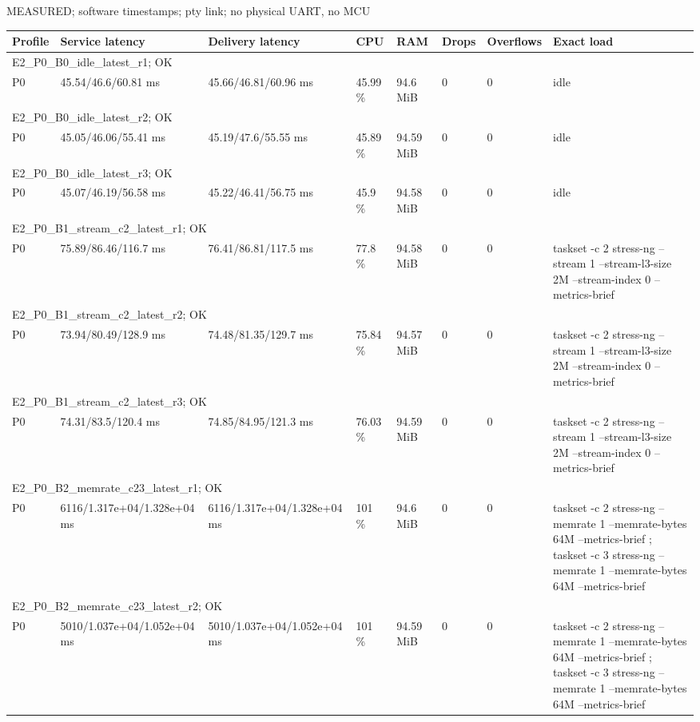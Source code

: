 \par\noindent MEASURED; software timestamps; pty link; no physical UART, no MCU\par
\begin{tabular}{llllllll}
\toprule
Profile & Service latency & Delivery latency & CPU & RAM & Drops & Overflows & Exact load \\
\midrule
\multicolumn{8}{l}{E2\_P0\_B0\_idle\_latest\_r1; OK} \\
P0 & 45.54/46.6/60.81 ms & 45.66/46.81/60.96 ms & 45.99 \% & 94.6 MiB & 0 & 0 & idle \\
\multicolumn{8}{l}{E2\_P0\_B0\_idle\_latest\_r2; OK} \\
P0 & 45.05/46.06/55.41 ms & 45.19/47.6/55.55 ms & 45.89 \% & 94.59 MiB & 0 & 0 & idle \\
\multicolumn{8}{l}{E2\_P0\_B0\_idle\_latest\_r3; OK} \\
P0 & 45.07/46.19/56.58 ms & 45.22/46.41/56.75 ms & 45.9 \% & 94.58 MiB & 0 & 0 & idle \\
\multicolumn{8}{l}{E2\_P0\_B1\_stream\_c2\_latest\_r1; OK} \\
P0 & 75.89/86.46/116.7 ms & 76.41/86.81/117.5 ms & 77.8 \% & 94.58 MiB & 0 & 0 & taskset -c 2 stress-ng --stream 1 --stream-l3-size 2M --stream-index 0 --metrics-brief \\
\multicolumn{8}{l}{E2\_P0\_B1\_stream\_c2\_latest\_r2; OK} \\
P0 & 73.94/80.49/128.9 ms & 74.48/81.35/129.7 ms & 75.84 \% & 94.57 MiB & 0 & 0 & taskset -c 2 stress-ng --stream 1 --stream-l3-size 2M --stream-index 0 --metrics-brief \\
\multicolumn{8}{l}{E2\_P0\_B1\_stream\_c2\_latest\_r3; OK} \\
P0 & 74.31/83.5/120.4 ms & 74.85/84.95/121.3 ms & 76.03 \% & 94.59 MiB & 0 & 0 & taskset -c 2 stress-ng --stream 1 --stream-l3-size 2M --stream-index 0 --metrics-brief \\
\multicolumn{8}{l}{E2\_P0\_B2\_memrate\_c23\_latest\_r1; OK} \\
P0 & 6116/1.317e+04/1.328e+04 ms & 6116/1.317e+04/1.328e+04 ms & 101 \% & 94.6 MiB & 0 & 0 & taskset -c 2 stress-ng --memrate 1 --memrate-bytes 64M --metrics-brief ; taskset -c 3 stress-ng --memrate 1 --memrate-bytes 64M --metrics-brief \\
\multicolumn{8}{l}{E2\_P0\_B2\_memrate\_c23\_latest\_r2; OK} \\
P0 & 5010/1.037e+04/1.052e+04 ms & 5010/1.037e+04/1.052e+04 ms & 101 \% & 94.59 MiB & 0 & 0 & taskset -c 2 stress-ng --memrate 1 --memrate-bytes 64M --metrics-brief ; taskset -c 3 stress-ng --memrate 1 --memrate-bytes 64M --metrics-brief \\

\end{tabular}
